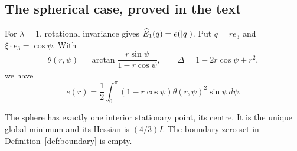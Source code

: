 \subsection{The spherical case, proved in the text}\label{sec:sphere}
For $\lambda=1$, rotational invariance gives $\widehat E_1(q)=e(|q|)$. Put $q=re_3$ and $\xi\cdot e_3=\cos\psi$. With
\[
 \theta(r,\psi)=\arctan\frac{r\sin\psi}{1-r\cos\psi},\qquad
 \Delta=1-2r\cos\psi+r^2,
\]
we have
\begin{equation}\label{eq:sphere_energy}
 e(r)=\frac12\int_0^\pi(1-r\cos\psi)\theta(r,\psi)^2\sin\psi\,d\psi.
\end{equation}

\begin{proposition}\label{prop:sphere}
The sphere has exactly one interior stationary point, its centre. It is the unique global minimum and its Hessian is $(4/3)I$. The boundary zero set in Definition~\ref{def:boundary} is empty.
\end{proposition}
